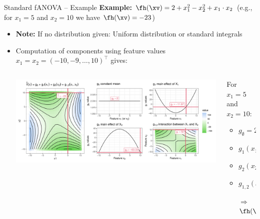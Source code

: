 \documentclass[11pt,compress,t,notes=noshow, aspectratio=169, xcolor=table]{beamer}
\newcommand{\open}{}
\newcommand{\close}{}
\begin{document}
\begin{frame}{Standard fANOVA -- Example}
\textbf{Example:} $\fh(\xv) = 2 + x_1^2 - x_2^2 + x_1 \cdot x_2$ (e.g., for $x_1 = 5$ and $x_2 = 10$ we have $\fh(\xv) = -23$)

\begin{itemize}
    \item \textbf{Note:} If no distribution given: Uniform distribution or standard integrals
    \item Computation of components using feature values $x_1 = x_2 = (-10, -9, \ldots, 10)^\top$ gives:
    \begin{columns}[c, totalwidth=\linewidth]
    \begin{column}{0.75\textwidth}
        \includegraphics[width = \textwidth]{figure/decomposition}
    \end{column}
    \begin{column}{0.25\textwidth}
    For $x_1 = 5$ and $x_2 = 10$:\\
    \begin{itemize}
        \item $g_{\open \emptyset \close} = 2$
        \item $g_{\open 1 \close}(x_1) = -9.67$
        \item $g_{\open 2 \close}(x_2) = -65.33$
        \item $g_{\open 1,2 \close}(x_1, x_2) = 50$
        \item[$\Rightarrow$] $\fh(\xv) = -23$
    \end{itemize}
    \end{column}
    \end{columns}
\end{itemize} 
\end{frame}
\end{document}
